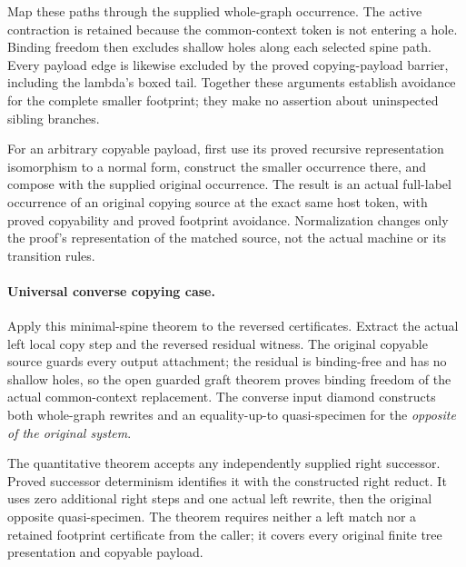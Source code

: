 Map these paths through the supplied whole-graph occurrence. The active
contraction is retained because the common-context token is not entering
a hole. Binding freedom then excludes shallow holes along each selected
spine path. Every payload edge is likewise excluded by the proved
copying-payload barrier, including the lambda's boxed tail. Together these
arguments establish avoidance for the complete smaller footprint; they
make no assertion about uninspected sibling branches.

For an arbitrary copyable payload, first use its proved recursive
representation isomorphism to a normal form, construct the smaller
occurrence there, and compose with the supplied original occurrence.
The result is an actual full-label occurrence of an original copying
source at the exact same host token, with proved copyability and proved
footprint avoidance. Normalization changes only the proof's representation
of the matched source, not the actual machine or its transition rules.

\paragraph{Universal converse copying case.}
Apply this minimal-spine theorem to the reversed certificates. Extract the
actual left local copy step and the reversed residual witness. The original
copyable source guards every output attachment; the residual is binding-free
and has no shallow holes, so the open guarded graft theorem proves binding
freedom of the actual common-context replacement. The converse input diamond
constructs both whole-graph rewrites and an equality-up-to quasi-specimen
for the \emph{opposite of the original system}.

The quantitative theorem accepts any independently supplied right
successor. Proved successor determinism identifies it with the constructed
right reduct. It uses zero additional right steps and one actual left
rewrite, then the original opposite quasi-specimen. The theorem requires
neither a left match nor a retained footprint certificate from the caller;
it covers every original finite tree presentation and copyable payload.

